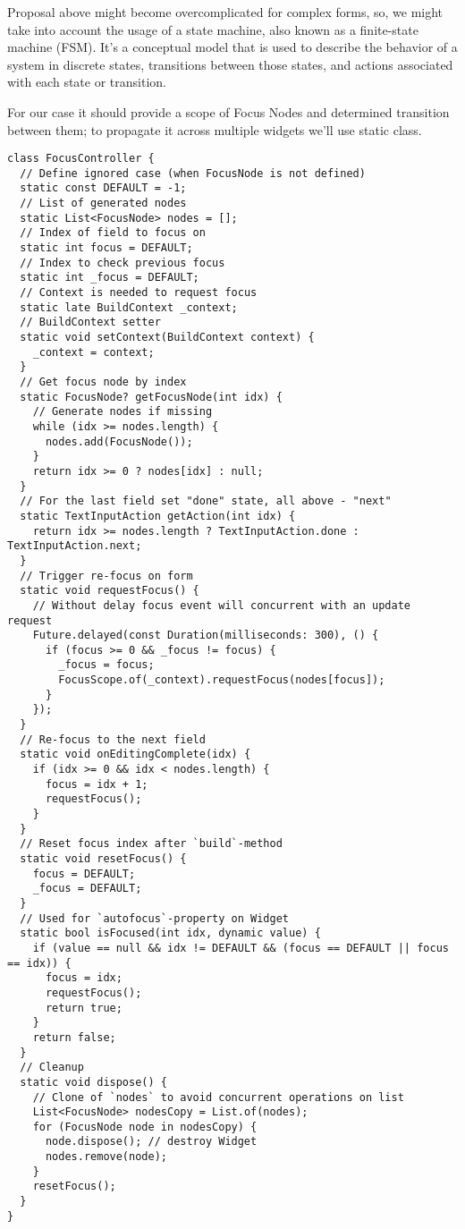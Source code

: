 Proposal above might become overcomplicated for complex forms, so, we might take into account the usage of a state 
machine, also known as a finite-state machine (FSM). It's a conceptual model that is used to describe the behavior of a 
system in discrete states, transitions between those states, and actions associated with each state or transition.

For our case it should provide a scope of Focus Nodes and determined transition between them; to propagate it across
multiple widgets we'll use static class.

\begin{lstlisting}
class FocusController {
  // Define ignored case (when FocusNode is not defined)
  static const DEFAULT = -1;
  // List of generated nodes
  static List<FocusNode> nodes = [];
  // Index of field to focus on
  static int focus = DEFAULT;
  // Index to check previous focus
  static int _focus = DEFAULT;
  // Context is needed to request focus
  static late BuildContext _context;
  // BuildContext setter
  static void setContext(BuildContext context) {
    _context = context;
  }
  // Get focus node by index
  static FocusNode? getFocusNode(int idx) {
    // Generate nodes if missing
    while (idx >= nodes.length) {
      nodes.add(FocusNode());
    }
    return idx >= 0 ? nodes[idx] : null;
  }
  // For the last field set "done" state, all above - "next"
  static TextInputAction getAction(int idx) {
    return idx >= nodes.length ? TextInputAction.done : TextInputAction.next;
  }
  // Trigger re-focus on form
  static void requestFocus() {
    // Without delay focus event will concurrent with an update request
    Future.delayed(const Duration(milliseconds: 300), () {
      if (focus >= 0 && _focus != focus) {
        _focus = focus;
        FocusScope.of(_context).requestFocus(nodes[focus]);
      }
    });
  }
  // Re-focus to the next field
  static void onEditingComplete(idx) {
    if (idx >= 0 && idx < nodes.length) {
      focus = idx + 1;
      requestFocus();
    }
  }
  // Reset focus index after `build`-method
  static void resetFocus() {
    focus = DEFAULT;
    _focus = DEFAULT;
  }
  // Used for `autofocus`-property on Widget
  static bool isFocused(int idx, dynamic value) {
    if (value == null && idx != DEFAULT && (focus == DEFAULT || focus == idx)) {
      focus = idx;
      requestFocus();
      return true;
    }
    return false;
  }
  // Cleanup
  static void dispose() {
    // Clone of `nodes` to avoid concurrent operations on list
    List<FocusNode> nodesCopy = List.of(nodes);
    for (FocusNode node in nodesCopy) {
      node.dispose(); // destroy Widget
      nodes.remove(node);
    }
    resetFocus();
  }
}
\end{lstlisting}

